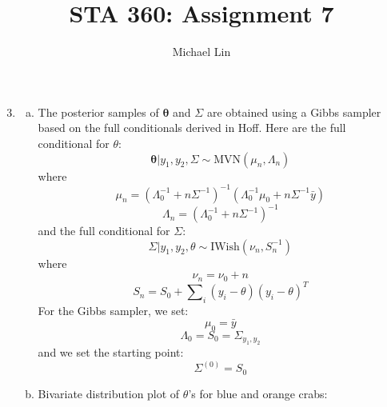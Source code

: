 \documentclass{article}
\title{STA 360: Assignment 7}
\author{Michael Lin}
\begin{document}
\maketitle


\begin{enumerate}[7.1]
	\setcounter{enumi}{2}
	\item
	\begin{enumerate}[(a)]
		\item The posterior samples of $\mathbf{\theta}$ and $\Sigma$ are obtained using a Gibbs sampler based on the full conditionals derived in Hoff. Here are the full conditional for $\theta$:
		$$\mathbf{\theta}|y_1, y_2, \Sigma \sim \text{MVN}(\mu_n, \Lambda_n)$$
		where
		$$\mu_n = (\Lambda_0^{-1}+n\Sigma^{-1})^{-1}(\Lambda_0^{-1}\mu_0+n\Sigma^{-1}\bar{y}) $$
		$$\Lambda_n = (\Lambda_0^{-1}+n\Sigma^{-1})^{-1} $$
		and the full conditional for $\Sigma$:
		$$\Sigma|y_1, y_2, \theta \sim \text{IWish}(\nu_n, S_n^{-1})$$
		where
		$$\nu_n = \nu_0 + n$$
		$$ S_n = S_0 + \sum\nolimits_{i} (y_i-\theta)(y_i-\theta)^T$$
		For the Gibbs sampler, we set:
		$$ \mu_0 = \bar{y}$$
		$$\Lambda_0 = S_0 = \Sigma_{y_1, y_2}$$
		and we set the starting point:
		$$\Sigma^{(0)}=S_0 $$
		
		\item Bivariate distribution plot of $\theta$'s for blue and orange crabs:
		

\end{enumerate}
\end{enumerate}
\end{document}
